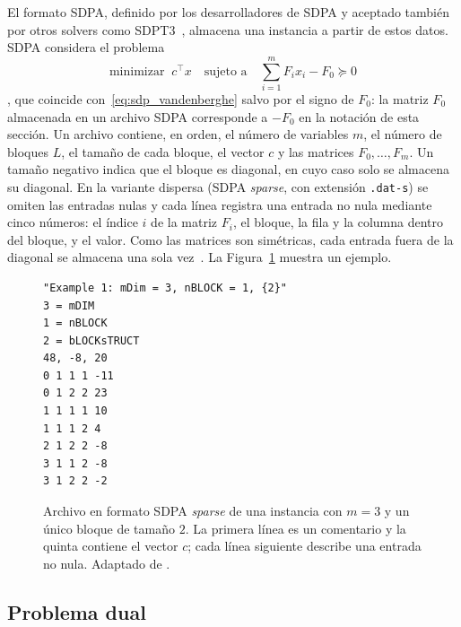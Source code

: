 El formato SDPA, definido por los desarrolladores de SDPA y aceptado también por otros solvers
como SDPT3~\parencite{tohImplementationUsageSDPT32012a}, almacena una instancia a partir de estos
datos. SDPA considera el problema
\[
    \text{minimizar} \;\; c^\top x
    \quad \text{sujeto a} \quad
    \sum_{i=1}^{m} F_i x_i - F_0 \succeq 0
\]
\parencite{SDPAFormat}, que coincide con~\eqref{eq:sdp_vandenberghe} salvo por el signo de
$F_0$: la matriz $F_0$ almacenada en un archivo SDPA corresponde a $-F_0$ en la notación de esta
sección. Un archivo contiene, en orden, el número de variables $m$, el número de bloques $L$, el
tamaño de cada bloque, el vector $c$ y las matrices $F_0, \ldots, F_m$. Un tamaño negativo indica
que el bloque es diagonal, en cuyo caso solo se almacena su diagonal. En la variante dispersa
(SDPA \textit{sparse}, con extensión \texttt{.dat-s}) se omiten las entradas nulas y cada línea
registra una entrada no nula mediante cinco números: el índice $i$ de la matriz $F_i$, el bloque,
la fila y la columna dentro del bloque, y el valor. Como las matrices son simétricas, cada entrada
fuera de la diagonal se almacena una sola vez~\parencite{SDPAFormat}. La
Figura~\ref{fig:sdpa_sparse} muestra un ejemplo.

\begin{figure}[H]
    \centering
\begin{minipage}{0.55\textwidth}
\begin{lstlisting}[basicstyle=\ttfamily\small\setstretch{1}, frame=single, columns=fullflexible]
"Example 1: mDim = 3, nBLOCK = 1, {2}"
3 = mDIM
1 = nBLOCK
2 = bLOCKsTRUCT
48, -8, 20
0 1 1 1 -11
0 1 2 2 23
1 1 1 1 10
1 1 1 2 4
2 1 2 2 -8
3 1 1 2 -8
3 1 2 2 -2
\end{lstlisting}
\end{minipage}
    \caption[Ejemplo de archivo en formato SDPA \textit{sparse}.]{Archivo en formato SDPA
    \textit{sparse} de una instancia con $m = 3$ y un único bloque de tamaño $2$. La primera
    línea es un comentario y la quinta contiene el vector $c$; cada línea siguiente describe una
    entrada no nula. Adaptado de \textcite{SDPAFormat}.}
    \label{fig:sdpa_sparse}
\end{figure}

\subsection{Problema dual}
\label{subsec:sdp_dual}

